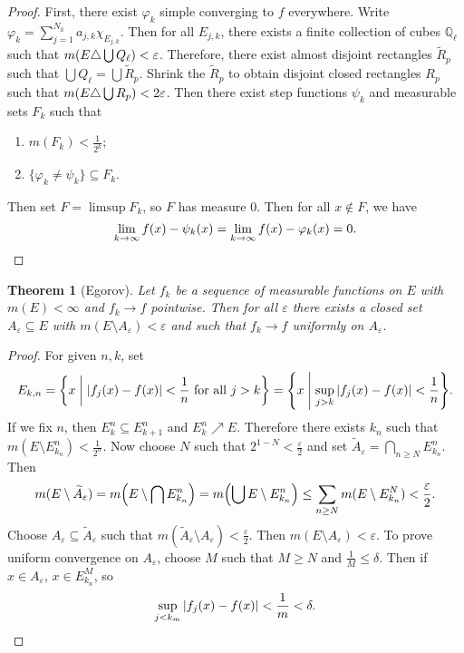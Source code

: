 \documentclass[leqno, openany]{memoir}
\newtheorem{thm}{Theorem}[chapter]
\theoremstyle{definition}
\theoremstyle{remark}
\theoremstyle{plain}
\theoremstyle{definition}
\theoremstyle{remark}
\newcommand{\Q}{\mathbb{Q}}
\newcommand{\ep}{\varepsilon}
\newcommand{\wt}[1]{\widetilde{#1}}
\begin{document}
\begin{proof} First, there exist $\varphi_k$ simple converging to $f$
    everywhere. Write $\varphi_k = \sum_{j=1}^{N_k} a_{j,k} \chi_{E_{j,k}}$.
    Then for all $E_{j,k}$, there exists a finite collection of cubes
    $\Q_{\ell}$ such that $m\qty(E \triangle \bigcup Q_{\ell}) < \ep$.
    Therefore, there exist almost disjoint rectangles $\wt{R}_p$ such that
    $\bigcup Q_{\ell} = \bigcup \wt{R}_p$. Shrink the $\wt{R}_p$ to obtain
    disjoint closed rectangles $R_p$ such that $m\qty(E \triangle \bigcup R_p)
    < 2 \ep$. Then there exist step functions $\psi_k$ and measurable sets
    $F_k$ such that \begin{enumerate} \item $m(F_k) < \frac{1}{2^k}$; \item $\{
        \varphi_k \neq \psi_k \} \subseteq F_k$.  \end{enumerate} Then set $F =
        \limsup F_k$, so $F$ has measure $0$. Then for all $x \notin F$, we
        have \[ \lim_{k \to \infty} f(x) - \psi_k(x) = \lim_{k \to \infty} f(x)
        - \varphi_k(x) = 0. \qedhere \] \end{proof}

\begin{thm}[Egorov] Let $f_k$ be a sequence of measurable functions on $E$ with
    $m(E) < \infty$ and $f_k \to f$ pointwise. Then for all $\ep$ there exists
    a closed set $A_{\ep} \subseteq E$ with $m(E \setminus A_{\ep}) < \ep$ and
    such that $f_k \to f$ uniformly on $A_{\ep}$.  \end{thm}

\begin{proof} For given $n,k$, set \[ E_{k,n} = \qty{x \mathrel{\bigg|}
\abs{f_j(x) - f(x)} < \frac{1}{n} \text{ for all } j > k} = \qty{x
\mathrel{\Bigg|} \sup_{j>k} \abs{f_j(x) - f(x)} < \frac{1}{n}}. \] If we fix
$n$, then $E_k^n \subseteq E_{k+1}^n$ and $E_k^n \nearrow E$. Therefore there
exists $k_n$ such that $m(E \setminus E_{k_n}^n) < \frac{1}{2^n}$. Now choose
$N$ such that $2^{1-N} < \frac{\ep}{2}$ and set $\wt{A}_{\ep} = \bigcap_{n \geq
N} E_{k_n}^n$. Then \[ m(E \setminus \wt{A}_{\ep}) = m\qty(E \setminus \bigcap
E_{k_n}^n) = m\qty(\bigcup E \setminus E_{k_n}^n) \leq \sum_{n \geq N} m(E
\setminus E_{k_n}^N) < \frac{\ep}{2}. \] Choose $A_{\ep} \subseteq
\wt{A}_{\ep}$ such that $m(\wt{A}_{\ep} \setminus A_{\ep}) < \frac{\ep}{2}$.
Then $m(E \setminus A_{\ep}) < \ep$. To prove uniform convergence on $A_{\ep}$,
choose $M$ such that $M \geq N$ and $\frac{1}{M} \leq \delta$. Then if $x \in
A_{\ep}$, $x \in E_{k_n}^M$, so \[ \sup_{j < k_m} \abs{f_j(x) - f(x)} <
\frac{1}{m} < \delta. \qedhere \] \end{proof}
\end{document}

